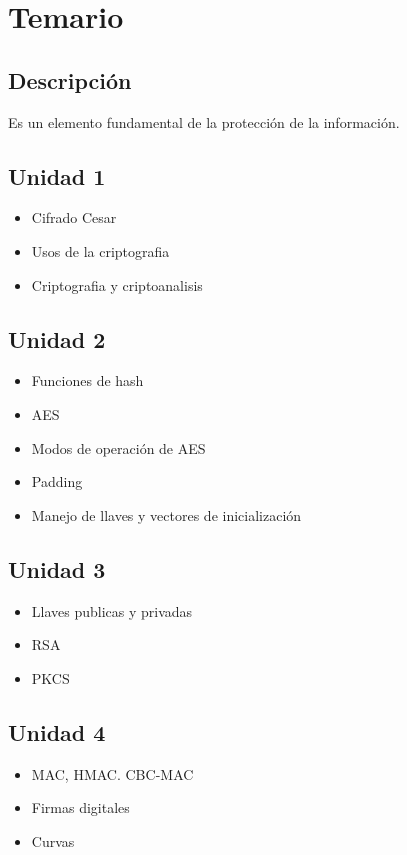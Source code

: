 \documentclass[11pt]{article}
\begin{document}
\section{Temario}
\label{sec:org89ac879}
\subsection{Descripción}
\label{sec:org5278d35}
Es un elemento fundamental de la protección de la información.
\subsection{Unidad 1}
\label{sec:orge78eda0}
\begin{itemize}
\item Cifrado Cesar
\item Usos de la criptografia
\item Criptografia y criptoanalisis
\end{itemize}
\subsection{Unidad 2}
\label{sec:org8847759}
\begin{itemize}
\item Funciones de hash
\item AES
\item Modos de operación de AES
\item Padding
\item Manejo de llaves y vectores de inicialización
\end{itemize}
\subsection{Unidad 3}
\label{sec:org39d85b4}
\begin{itemize}
\item Llaves publicas y privadas
\item RSA
\item PKCS
\end{itemize}
\subsection{Unidad 4}
\label{sec:org0f550ce}
\begin{itemize}
\item MAC, HMAC. CBC-MAC
\item Firmas digitales
\item Curvas
\end{itemize}
\end{document}
